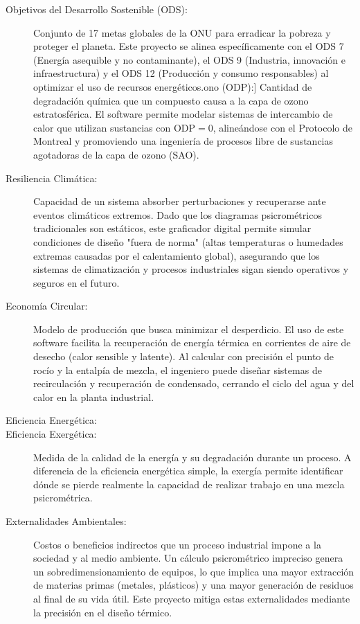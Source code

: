 \begin{description}
        \item[Objetivos del Desarrollo Sostenible (ODS):] Conjunto de 17 metas globales de la ONU para erradicar la pobreza y proteger el planeta. Este proyecto se alinea específicamente con el ODS 7 (Energía asequible y no contaminante), el ODS 9 (Industria, innovación e infraestructura) y el ODS 12 (Producción y consumo responsables) al optimizar el uso de recursos energéticos.ono (ODP):] Cantidad de degradación química que un compuesto causa a la capa de ozono estratosférica. El software permite modelar sistemas de intercambio de calor que utilizan sustancias con $\text{ODP} = 0$, alineándose con el Protocolo de Montreal y promoviendo una ingeniería de procesos libre de sustancias agotadoras de la capa de ozono (SAO).
        \item[Resiliencia Climática:] Capacidad de un sistema absorber perturbaciones y recuperarse ante eventos climáticos extremos. Dado que los diagramas psicrométricos tradicionales son estáticos, este graficador digital permite simular condiciones de diseño "fuera de norma" (altas temperaturas o humedades extremas causadas por el calentamiento global), asegurando que los sistemas de climatización y procesos industriales sigan siendo operativos y seguros en el futuro.
        \item[Economía Circular:] Modelo de producción que busca minimizar el desperdicio. El uso de este software facilita la recuperación de energía térmica en corrientes de aire de desecho (calor sensible y latente). Al calcular con precisión el punto de rocío y la entalpía de mezcla, el ingeniero puede diseñar sistemas de recirculación y recuperación de condensado, cerrando el ciclo del agua y del calor en la planta industrial.
        \item[Eficiencia Energética:]   
        \item[Eficiencia Exergética:] Medida de la calidad de la energía y su degradación durante un proceso. A diferencia de la eficiencia energética simple, la exergía permite identificar dónde se pierde realmente la capacidad de realizar trabajo en una mezcla psicrométrica. %

        \item[Externalidades Ambientales:] Costos o beneficios indirectos que un proceso industrial impone a la sociedad y al medio ambiente. Un cálculo psicrométrico impreciso genera un sobredimensionamiento de equipos, lo que implica una mayor extracción de materias primas (metales, plásticos) y una mayor generación de residuos al final de su vida útil. Este proyecto mitiga estas externalidades mediante la precisión en el diseño térmico.
    \end{description}


